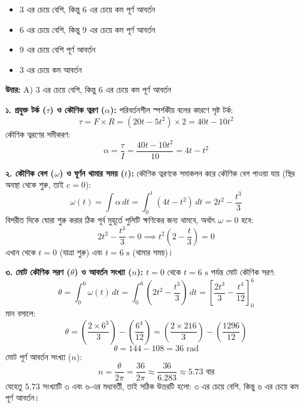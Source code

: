 \documentclass[12pt, a4paper]{article}
\begin{document}
{%
\begin{itemize}[label={}, leftmargin=1cm, itemsep=0.5em]
\item[\textbf{A)}] $3$ এর চেয়ে বেশি, কিন্তু $6$ এর চেয়ে কম পূর্ণ আবর্তন
\item[\textbf{B)}] $6$ এর চেয়ে বেশি, কিন্তু $9$ এর চেয়ে কম পূর্ণ আবর্তন
\item[\textbf{C)}] $9$ এর চেয়ে বেশি পূর্ণ আবর্তন
\item[\textbf{D)}] $3$ এর চেয়ে কম আবর্তন
\end{itemize}

\vspace{0.5em}
\begin{tcolorbox}[answerbox]
\textbf{\color{success} উত্তর:} A) $3$ এর চেয়ে বেশি, কিন্তু $6$ এর চেয়ে কম পূর্ণ আবর্তন
\end{tcolorbox}
\vspace{1em}

\begin{tcolorbox}[solutionbox={সমাধান (Solution)}]
\noindent
\textbf{১. প্রযুক্ত টর্ক ($\tau$) ও কৌণিক ত্বরণ ($\alpha$):}
পরিবর্তনশীল স্পর্শকীয় বলের কারণে সৃষ্ট টর্ক:
$$\tau = F \times R = (20t - 5t^2) \times 2 = 40t - 10t^2$$
কৌণিক ত্বরণের সমীকরণ:
$$\alpha = \frac{\tau}{I} = \frac{40t - 10t^2}{10} = 4t - t^2$$

\vspace{0.5em}
\textbf{২. কৌণিক বেগ ($\omega$) ও ঘূর্ণন থামার সময় ($t$):}
কৌণিক ত্বরণকে সমাকলন করে কৌণিক বেগ পাওয়া যায় (স্থির অবস্থা থেকে শুরু, তাই $c=0$):
$$\omega(t) = \int \alpha \, dt = \int_0^t (4t - t^2) \, dt = 2t^2 - \frac{t^3}{3}$$
বিপরীত দিকে ঘোরা শুরু করার ঠিক পূর্ব মুহূর্তে পুলিটি ক্ষণিকের জন্য থামবে, অর্থাৎ $\omega = 0$ হবে:
$$2t^2 - \frac{t^3}{3} = 0 \implies t^2 \left(2 - \frac{t}{3}\right) = 0$$
এখান থেকে $t = 0$ (যাত্রা শুরু) এবং $t = 6\text{ s}$ (থামার সময়)।

\vspace{0.5em}
\textbf{৩. মোট কৌণিক সরণ ($\theta$) ও আবর্তন সংখ্যা ($n$):}
$t = 0$ থেকে $t = 6\text{ s}$ পর্যন্ত মোট কৌণিক সরণ:
$$\theta = \int_0^6 \omega(t) \, dt = \int_0^6 \left(2t^2 - \frac{t^3}{3}\right) \, dt = \left[ \frac{2t^3}{3} - \frac{t^4}{12} \right]_0^6$$
মান বসালে:
$$\theta = \left( \frac{2 \times 6^3}{3} \right) - \left( \frac{6^4}{12} \right) = \left(\frac{2 \times 216}{3}\right) - \left(\frac{1296}{12}\right)$$
$$\theta = 144 - 108 = 36\text{ rad}$$
মোট পূর্ণ আবর্তন সংখ্যা ($n$):
$$n = \frac{\theta}{2\pi} = \frac{36}{2\pi} \approx \frac{36}{6.283} \approx 5.73 \text{ বার}$$
যেহেতু $5.73$ সংখ্যাটি ৩ এবং ৬-এর মধ্যবর্তী, তাই সঠিক উত্তরটি হলো: ৩ এর চেয়ে বেশি, কিন্তু ৬ এর চেয়ে কম পূর্ণ আবর্তন।
\end{tcolorbox}
\vspace{1em}

}
\end{document}
